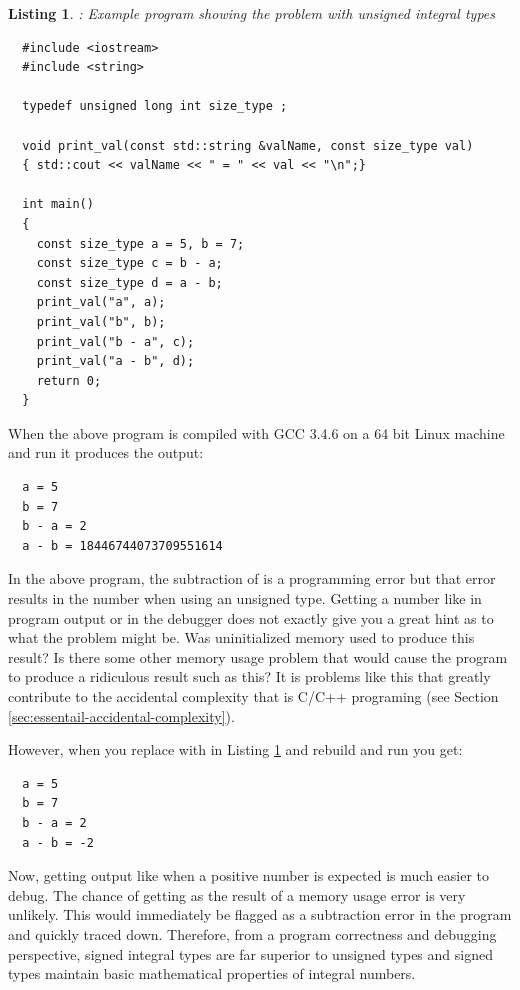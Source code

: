 \documentclass[pdf,ps2pdf,11pt]{SANDreport}
\newtheorem{listing}{Listing}
\begin{document}
{}\begin{listing}: Example program showing the problem with unsigned
integral types
\label{listing:unsigned-int-problem}
{\small\begin{verbatim}
  #include <iostream>
  #include <string>
  
  typedef unsigned long int size_type ;
  
  void print_val(const std::string &valName, const size_type val)
  { std::cout << valName << " = " << val << "\n";}
  
  int main()
  {
    const size_type a = 5, b = 7;
    const size_type c = b - a;
    const size_type d = a - b;
    print_val("a", a);
    print_val("b", b);
    print_val("b - a", c);
    print_val("a - b", d);
    return 0;
  }
\end{verbatim}}
\end{listing}


When the above program is compiled with GCC 3.4.6 on a 64 bit Linux
machine and run it produces the output:


{\small\begin{verbatim}
  a = 5
  b = 7
  b - a = 2
  a - b = 18446744073709551614
\end{verbatim}}


In the above program, the subtraction of {} is a programming
error but that error results in the number
{} when using an unsigned type.  Getting a
number like {} in program output or in the
debugger does not exactly give you a great hint as to what the problem
might be.  Was uninitialized memory used to produce this result?  Is
there some other memory usage problem that would cause the program to
produce a ridiculous result such as this?  It is problems like this
that greatly contribute to the accidental complexity that is C/C++
programing (see Section {}\ref{sec:essentail-accidental-complexity}).

However, when you replace {} with {} in Listing {}\ref{listing:unsigned-int-problem} and rebuild and
run you get:


{\small\begin{verbatim}
  a = 5
  b = 7
  b - a = 2
  a - b = -2
\end{verbatim}}


Now, getting output like {} when a positive number is expected
is much easier to debug.  The chance of getting {} as the
result of a memory usage error is very unlikely.  This would
immediately be flagged as a subtraction error in the program and
quickly traced down.  Therefore, from a program correctness and
debugging perspective, signed integral types are far superior to
unsigned types and signed types maintain basic mathematical properties
of integral numbers.
\end{document}
